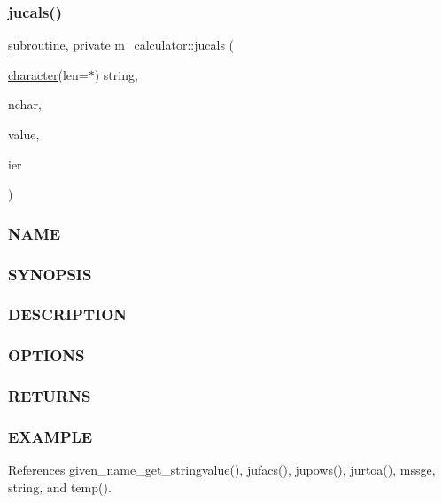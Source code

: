\subsubsection{\texorpdfstring{jucals()}{jucals()}}
{\footnotesize\ttfamily \hyperlink{M__stopwatch_83_8txt_acfbcff50169d691ff02d4a123ed70482}{subroutine}, private m\+\_\+calculator\+::jucals (\begin{DoxyParamCaption}\item[{\hyperlink{option__stopwatch_83_8txt_abd4b21fbbd175834027b5224bfe97e66}{character}(len=$\ast$)}]{string,  }\item[{}]{nchar,  }\item[{}]{value,  }\item[{}]{ier }\end{DoxyParamCaption})\hspace{0.3cm}{\ttfamily [private]}}



\subsubsection*{N\+A\+ME}

\subsubsection*{S\+Y\+N\+O\+P\+S\+IS}

\subsubsection*{D\+E\+S\+C\+R\+I\+P\+T\+I\+ON}

\subsubsection*{O\+P\+T\+I\+O\+NS}

\subsubsection*{R\+E\+T\+U\+R\+NS}

\subsubsection*{E\+X\+A\+M\+P\+LE}

References given\+\_\+name\+\_\+get\+\_\+stringvalue(), jufacs(), jupows(), jurtoa(), mssge, string, and temp().

